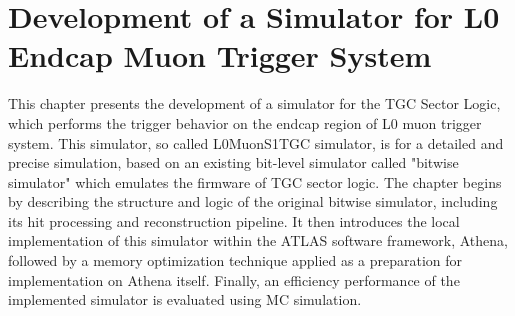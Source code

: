 \chapter{Development of a Simulator for L0 Endcap Muon Trigger System} \label{ch:L0MuonS1TGC}
This chapter presents the development of a simulator for the TGC Sector Logic, which performs the trigger behavior on the endcap region of L0 muon trigger system. This simulator, so called L0MuonS1TGC simulator, is for a detailed and precise simulation, based on an existing bit-level simulator called "bitwise simulator" which emulates the firmware of TGC sector logic. The chapter begins by describing the structure and logic of the original bitwise simulator, including its hit processing and reconstruction pipeline. It then introduces the local implementation of this simulator within the ATLAS software framework, Athena, followed by a memory optimization technique applied as a preparation for implementation on Athena itself. Finally, an efficiency performance of the implemented simulator is evaluated using MC simulation.
